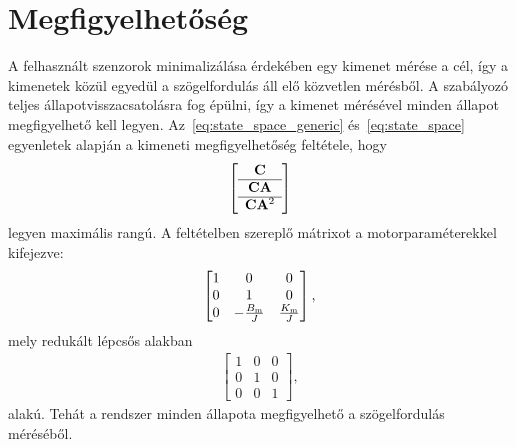 \chapter{Megfigyelhetőség}\label{chap:observability}
A felhasznált szenzorok minimalizálása érdekében egy kimenet mérése a cél, így a kimenetek közül egyedül a 
szögelfordulás áll elő közvetlen mérésből. A szabályozó teljes állapotvisszacsatolásra fog épülni, 
így a kimenet mérésével minden állapot megfigyelhető kell legyen. 
Az~\eqref{eq:state_space_generic} és~\eqref{eq:state_space} egyenletek alapján a kimeneti megfigyelhetőség feltétele, hogy
\begin{align}
    \left[\begin{array}{c}
        \mathbf{C} \\ \hline
        \mathbf{CA} \\ \hline
        \mathbf{C} \mathbf{A}^2
    \end{array}\right]
\end{align}
legyen maximális rangú. A feltételben szereplő mátrixot a motorparaméterekkel kifejezve:
\begin{align}
    \begin{bmatrix}
        1 & 0 & 0 \\
        0 & 1 & 0 \\
        0 & -\frac{B_{\mathrm{m}}}{J} & \frac{K_{\mathrm{m}}}{J}
    \end{bmatrix},
\end{align}
mely redukált lépcsős alakban
\begin{align}
    \begin{bmatrix}
        1 & 0 & 0 \\
        0 & 1 & 0 \\
        0 & 0 & 1
    \end{bmatrix},
\end{align}
alakú. Tehát a rendszer minden állapota megfigyelhető a szögelfordulás méréséből.
